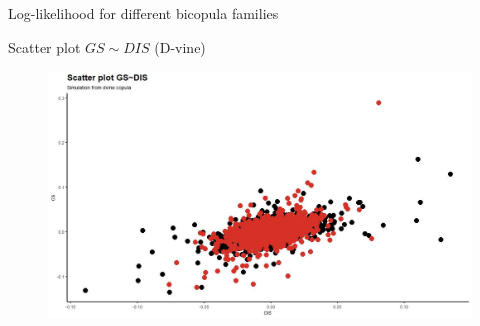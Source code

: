 \documentclass{beamer}
\begin{document}
\begin{frame}{Log-likelihood for different bicopula families}

\centering
\begin{table}
   
\end{table}

\end{frame}

\begin{frame}{Scatter plot $GS \sim DIS$ (D-vine)}

\centering
\begin{figure}[!h]
  \centering
    \includegraphics[width=1\textwidth]{figures/GS_vs_DIS/GS_vs_DIS_dvine.jpeg}
\end{figure}
\end{frame}
\end{document}
